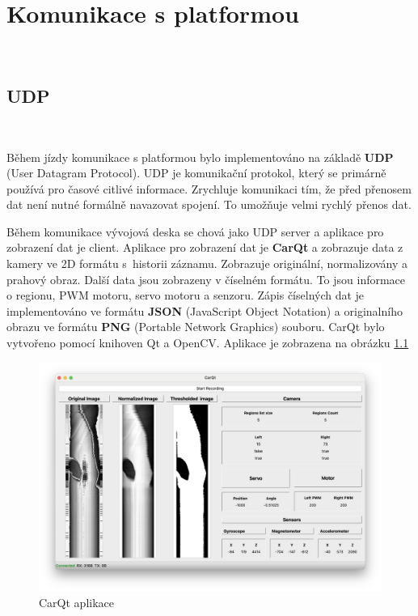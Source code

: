 \chapter{Komunikace s platformou}
\label{sec:PlatformCommunication}
\vspace{-20pt}
\

\section{UDP}\

Během jízdy komunikace s platformou bylo implementováno na základě \textbf{UDP}
(User Datagram Protocol).  UDP je komunikační protokol,
který se primárně používá pro časové citlivé informace.
Zrychluje komunikaci tím, že před přenosem dat není nutné formálně navazovat spojení.
To umožňuje velmi rychlý přenos dat\cite{UDP}.

Během komunikace vývojová deska se chová jako UDP server a aplikace pro zobrazení dat
je client. Aplikace pro zobrazení dat je \textbf{CarQt} a zobrazuje data z kamery
ve 2D formátu  s~historii záznamu. Zobrazuje originální,
normalizovány a prahový obraz. Další data
jsou zobrazeny v číselném formátu. To jsou informace o regionu, PWM motoru, servo motoru
a senzoru. Zápis číselných dat je implementováno ve formátu \textbf{JSON}
(JavaScript Object Notation) a originalního obrazu ve formátu \textbf{PNG}
(Portable Network Graphics) souboru. CarQt bylo vytvořeno pomocí knihoven Qt a OpenCV.
Aplikace je zobrazena na obrázku \ref{fig:CarQt}
\begin{figure}[!h]
    \vspace{-10pt}
    \centering
    \includegraphics[width = .5\linewidth]{Figures/CarQt.png}
    \caption{CarQt aplikace}
    \label{fig:CarQt}
    \vspace{-10pt}
\end{figure}


